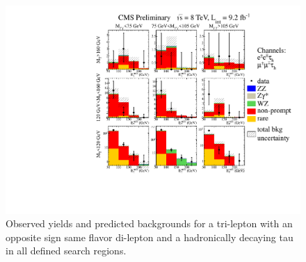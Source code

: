 \begin{figure}[htp]
\begin{center}
\includegraphics[width=1.0\textwidth]{plots/3lfinal/ossf1tau1.pdf}
\caption{Observed yields and predicted backgrounds for a tri-lepton with an opposite sign same flavor di-lepton 
and a hadronically decaying tau  in all defined search regions.}
\label{fig:OSSF1tau1}
\end{center}
\end{figure}

